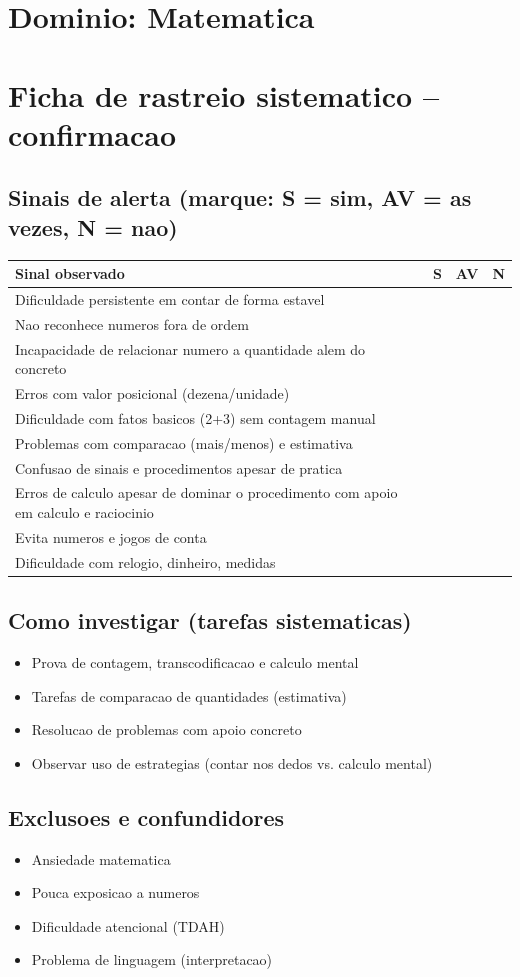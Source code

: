 \documentclass[a4paper,11pt]{book}
\begin{document}
\section*{Dominio: Matematica}
\section*{Ficha de rastreio sistematico -- confirmacao}
\subsection*{Sinais de alerta (marque: S = sim, AV = as vezes, N = nao)}
\begin{tabular}{@{}p{11.5cm}ccc@{}}\toprule
Sinal observado & S & AV & N \\\midrule
Dificuldade persistente em contar de forma estavel & & & \\
Nao reconhece numeros fora de ordem & & & \\
Incapacidade de relacionar numero a quantidade alem do concreto & & & \\
Erros com valor posicional (dezena/unidade) & & & \\
Dificuldade com fatos basicos (2+3) sem contagem manual & & & \\
Problemas com comparacao (mais/menos) e estimativa & & & \\
Confusao de sinais e procedimentos apesar de pratica & & & \\
Erros de calculo apesar de dominar o procedimento com apoio em calculo e raciocinio & & & \\
Evita numeros e jogos de conta & & & \\
Dificuldade com relogio, dinheiro, medidas & & & \\
\bottomrule\end{tabular}
\subsection*{Como investigar (tarefas sistematicas)}
\begin{itemize}
\item Prova de contagem, transcodificacao e calculo mental
\item Tarefas de comparacao de quantidades (estimativa)
\item Resolucao de problemas com apoio concreto
\item Observar uso de estrategias (contar nos dedos vs. calculo mental)
\end{itemize}
\subsection*{Exclusoes e confundidores}
\begin{itemize}
\item Ansiedade matematica
\item Pouca exposicao a numeros
\item Dificuldade atencional (TDAH)
\item Problema de linguagem (interpretacao)
\end{itemize}
\end{document}
